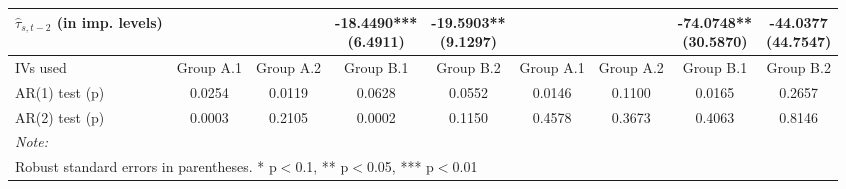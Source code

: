 \begin{table}[!h]
{\begin{tabular}[t]{lcccccccc}
\addlinespace
$\hat{\tau}_{s,t-2}$ (in imp. levels) &  &  & \makecell{-18.4490*** \\ (6.4911)} & \makecell{-19.5903** \\ (9.1297)} &  &  & \makecell{-74.0748** \\ (30.5870)} & \makecell{-44.0377 \\ (44.7547)}\\
\midrule
IVs used & Group A.1 & Group A.2 & Group B.1 & Group B.2 & Group A.1 & Group A.2 & Group B.1 & Group B.2\\
AR(1) test (p) & 0.0254 & 0.0119 & 0.0628 & 0.0552 & 0.0146 & 0.1100 & 0.0165 & 0.2657\\
AR(2) test (p) & 0.0003 & 0.2105 & 0.0002 & 0.1150 & 0.4578 & 0.3673 & 0.4063 & 0.8146\\
\bottomrule
\multicolumn{9}{l}{\rule{0pt}{1em}\textit{Note: }}\\
\multicolumn{9}{l}{\rule{0pt}{1em}Robust standard errors in parentheses. * p$<$0.1, ** p$<$0.05, *** p$<$0.01}\\
\end{tabular}}
\end{table}
